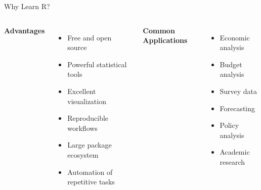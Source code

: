 \documentclass[aspectratio=169,11pt]{beamer}
\begin{document}
	
	\begin{frame}{Why Learn R?}
		
		\begin{columns}
			
			
			\textbf{Advantages}
			
			\begin{itemize}
				\item Free and open source
				\item Powerful statistical tools
				\item Excellent visualization
				\item Reproducible workflows
				\item Large package ecosystem
				\item Automation of repetitive tasks
			\end{itemize}
			
			
			\textbf{Common Applications}
			
			\begin{itemize}
				\item Economic analysis
				\item Budget analysis
				\item Survey data
				\item Forecasting
				\item Policy analysis
				\item Academic research
			\end{itemize}
			
		\end{columns}
		
	\end{frame}
	
\end{document}
